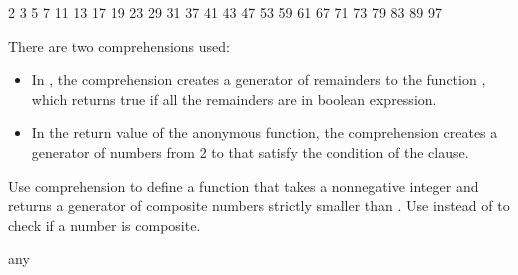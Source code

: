 \documentclass[letterpaper,10pt,english]{sphinxmanual}
\begin{document}
\begin{sphinxVerbatim}[commandchars=\\\{\}]
2 3 5 7 11 13 17 19 23 29 31 37 41 43 47 53 59 61 67 71 73 79 83 89 97
\end{sphinxVerbatim}

There are two comprehensions used:
\begin{itemize}
\item {} 
In , the comprehension creates a generator of remainders to the function , which returns true if all the remainders are  in boolean expression.

\item {} 
In the return value  of the anonymous function, the comprehension creates a generator of numbers from 2 to  that satisfy the condition of the  clause.

\end{itemize}

 Use comprehension to define a function  that takes a non\sphinxhyphen{}negative integer  and returns a generator of composite numbers strictly smaller than . Use  instead of  to check if a number is composite.

\begin{sphinxVerbatim}[commandchars=\\\{\}]
any
         
                                         

\end{sphinxVerbatim}
\end{document}
